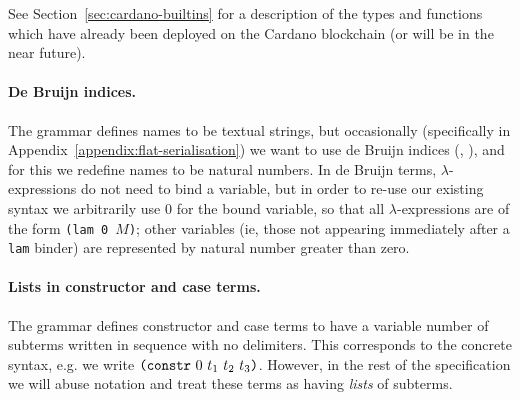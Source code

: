 See Section~\ref{sec:cardano-builtins}
for a description of the types and functions which have already been deployed on
the Cardano blockchain (or will be in the near future).


\paragraph{De Bruijn indices.}
The grammar defines names to be textual strings, but occasionally (specifically
in Appendix~\ref{appendix:flat-serialisation}) we want to use de Bruijn indices
(\cite{deBruijn}, \cite[C.3]{Barendregt}), and for this we redefine names to be
natural numbers.  In de Bruijn terms, $\lambda$-expressions do not need to bind
a variable, but in order to re-use our existing syntax we arbitrarily use 0 for
the bound variable, so that all $\lambda$-expressions are of the form
\texttt{(lam 0 $M$)}; other variables (ie, those not appearing immediately after
a \texttt{lam} binder) are represented by natural number greater than zero.

\paragraph{Lists in constructor and case terms.}
The grammar defines constructor and case terms to have a variable number of
subterms written in sequence with no delimiters. This corresponds to the
concrete syntax, e.g. we write $\texttt{(} \texttt{constr} ~ 0 ~ t_1\ t_2\ t_3 \texttt{)}$. However, in the
rest of the specification we will abuse notation and treat these terms as
having \emph{lists} of subterms.
